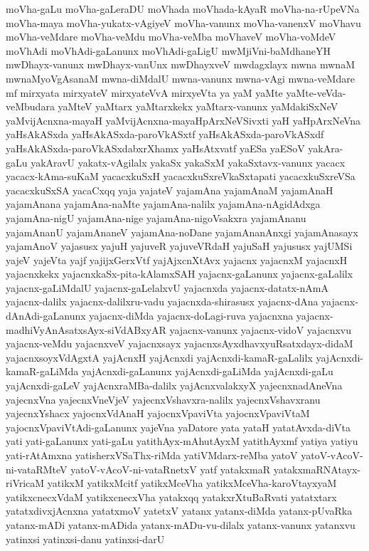 {moVha-gaLu
moVha-gaLeraDU
moVhada
moVhada-kAyaR
moVha-na-rUpeVNa
moVha-maya
moVha-yukatx-vAgiyeV
moVha-vanunx
moVha-vanenxV
moVhavu
moVha-veMdare
moVha-veMdu
moVha-veMba
moVhaveV
moVha-voMdeV
moVhAdi
moVhAdi-gaLanunx
moVhAdi-gaLigU
mwMjiVni-baMdhaneYH
mwDhayx-vanunx
mwDhayx-vanUnx
mwDhayxveV
mwdagxlayx
mwna
mwnaM
mwnaMyoVgAsanaM
mwna-diMdalU
mwna-vanunx
mwna-vAgi
mwna-veMdare
mf
mirxyata
mirxyateV
mirxyateVvA
mirxyeVta
ya
yaM
yaMte
yaMte-veVda-veMbudara
yaMteV
yaMtarx
yaMtarxkekx
yaMtarx-vanunx
yaMdakiSxNeV
yaMvijAcnxna-mayaH
yaMvijAcnxna-mayaHpArxNeVSivxti
yaH
yaHpArxNeVna
yaHsAkASxda
yaHsAkASxda-paroVkASxtf
yaHsAkASxda-paroVkASxdf
yaHsAkASxda-paroVkASxdabxrXhamx
yaHsAtxvatf
yaESa
yaESoV
yakAra-gaLu
yakAravU
yakatx-vAgilalx
yakaSx
yakaSxM
yakaSxtavx-vanunx
yacacx
yacacx-kAma-suKaM
yacacxkuSxH
yacacxkuSxreVkaSxtapati
yacacxkuSxreVSa
yacacxkuSxSA
yacaCxqq
yaja
yajateV
yajamAna
yajamAnaM
yajamAnaH
yajamAnana
yajamAna-naMte
yajamAna-nalilx
yajamAna-nAgidAdxga
yajamAna-nigU
yajamAna-nige
yajamAna-nigoVsakxra
yajamAnanu
yajamAnanU
yajamAnaneV
yajamAna-noDane
yajamAnanAnxgi
yajamAnasayx
yajamAnoV
yajasusx
yajuH
yajuveR
yajuveVRdaH
yajuSaH
yajususx
yajUMSi
yajeV
yajeVta
yajf
yajijxGerxVtf
yajAjxcnXtAvx
yajacnx
yajacnxM
yajacnxH
yajacnxkekx
yajacnxkaSx-pita-kAlamxSAH
yajacnx-gaLanunx
yajacnx-gaLalilx
yajacnx-gaLiMdalU
yajacnx-gaLelalxvU
yajacnxda
yajacnx-datatx-nAmA
yajacnx-dalilx
yajacnx-dalilxru-vadu
yajacnxda-shirasusx
yajacnx-dAna
yajacnx-dAnAdi-gaLanunx
yajacnx-diMda
yajacnx-doLagi-ruva
yajacnxna
yajacnx-madhiVyAnAsatxsAyx-siVdABxyAR
yajacnx-vanunx
yajacnx-vidoV
yajacnxvu
yajacnx-veMdu
yajacnxveV
yajacnxsayx
yajacnxsAyxdhavxyuRsatxdayx-didaM
yajacnxsoyxVdAgxtA
yajAcnxH
yajAcnxdi
yajAcnxdi-kamaR-gaLalilx
yajAcnxdi-kamaR-gaLiMda
yajAcnxdi-gaLanunx
yajAcnxdi-gaLiMda
yajAcnxdi-gaLu
yajAcnxdi-gaLeV
yajAcnxraMBa-dalilx
yajAcnxvalakxyX
yajecnxnadAneVna
yajecnxVna
yajecnxVneVjeV
yajecnxVshavxra-nalilx
yajecnxVshavxranu
yajecnxYshacx
yajocnxVdAnaH
yajocnxVpaviVta
yajocnxVpaviVtaM
yajocnxVpaviVtAdi-gaLanunx
yajeVna
yaDatore
yata
yataH
yatatAvxda-diVta
yati
yati-gaLanunx
yati-gaLu
yatithAyx-mAhutAyxM
yatithAyxmf
yatiya
yatiyu
yati-rAtAmxna
yatisherxVSaThx-riMda
yatiVMdarx-reMba
yatoV
yatoV-vAcoV-ni-vataRMteV
yatoV-vAcoV-ni-vataRnetxV
yatf
yatakxmaR
yatakxmaRNAtayx-riVricaM
yatikxM
yatikxMcitf
yatikxMceVha
yatikxMceVha-karoVtayxyaM
yatikxcnecxVdaM
yatikxcnecxVha
yatakxqq
yatakxrXtuBaRvati
yatatxtarx
yatatxdivxjAcnxna
yatatxmoV
yatetxV
yatanx
yatanx-diMda
yatanx-pUvaRka
yatanx-mADi
yatanx-mADida
yatanx-mADu-vu-dilalx
yatanx-vanunx
yatanxvu
yatinxsi
yatinxsi-danu
yatinxsi-darU
}
